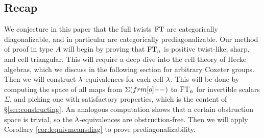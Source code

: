 \subsection{Recap}
\label{subsec:recap}

We conjecture in this paper that the full twists $\operatorname{FT}$ are categorically diagonalizable, and in particular are categorically prediagonalizable. Our method of proof in type $A$ will begin by proving that $\operatorname{FT}_n$ is positive twist-like, sharp, and cell triangular. This will require a deep dive into the cell theory of Hecke algebras, which we discuss in the following section for arbitrary Coxeter groups. Then we will construct $\lambda$-equivalences for each cell $\lambda$. This will be done by computing the space of all maps from $\Sigma(\one)$ to $\operatorname{FT}_n$ for
invertible scalars $\Sigma$, and picking one with satisfactory properties, which is the content of \S\ref{sec:constructing}. An analogous computation shows that a certain obstruction space is trivial, so the $\lambda$-equivalences are obstruction-free. Then we will apply Corollary \ref{cor:lequivmeansdiag} to prove prediagonalizability.

